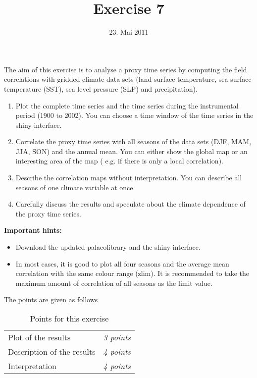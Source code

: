 \documentclass[a4paper,12pt]{article}
\title{Exercise 7}
\date{23. Mai 2011}
\begin{document}
\maketitle
\thispagestyle{fancy}

The aim of this exercise is to analyse a proxy time series by computing the field correlations with gridded climate data sets (land surface temperature, sea surface temperature (SST), sea level pressure (SLP) and precipitation).

\begin{enumerate}

\item Plot the complete time series and the time series during the instrumental period (1900 to 2002). You can choose a time window of the time series in the shiny interface.
\\


\item Correlate the proxy time series with all seasons of the data sets (DJF, MAM, JJA, SON) and the annual mean. You can either show the global map or an interesting area of the map ( e.g. if there is only a local correlation).\\


\item Describe the correlation maps without interpretation. You can describe all seasons of one climate variable at once.  
\\
\item Carefully discuss the results and speculate about the climate dependence of the proxy time series.  
\\


\end{enumerate}

\textbf{Important hints:}
\begin{itemize}
\item Download the updated palaeolibrary and the shiny interface.
\item  In most cases, it is good to plot all four seasons and the average mean correlation with the same colour range (zlim). It is recommended to take the maximum amount of correlation of all seasons as the limit value. 

\end{itemize}
\newpage
The points are given as follows

\begin{table}[h]
\centering
\begin{tabular}{lr}
	Plot of the results & \textit{ 3 points}\\
	Description of the results& \textit{ 4 points}\\
	Interpretation &\textit{ 4 points}

\end{tabular}
\caption{Points for this exercise}
\label{tab:}
\end{table}
\end{document}
